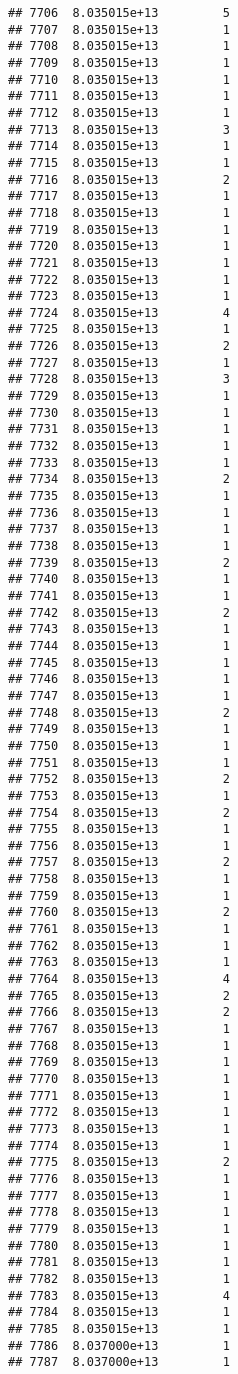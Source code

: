 \documentclass[
]{article}
\begin{document}
\begin{verbatim}
## 7706  8.035015e+13         5
## 7707  8.035015e+13         1
## 7708  8.035015e+13         1
## 7709  8.035015e+13         1
## 7710  8.035015e+13         1
## 7711  8.035015e+13         1
## 7712  8.035015e+13         1
## 7713  8.035015e+13         3
## 7714  8.035015e+13         1
## 7715  8.035015e+13         1
## 7716  8.035015e+13         2
## 7717  8.035015e+13         1
## 7718  8.035015e+13         1
## 7719  8.035015e+13         1
## 7720  8.035015e+13         1
## 7721  8.035015e+13         1
## 7722  8.035015e+13         1
## 7723  8.035015e+13         1
## 7724  8.035015e+13         4
## 7725  8.035015e+13         1
## 7726  8.035015e+13         2
## 7727  8.035015e+13         1
## 7728  8.035015e+13         3
## 7729  8.035015e+13         1
## 7730  8.035015e+13         1
## 7731  8.035015e+13         1
## 7732  8.035015e+13         1
## 7733  8.035015e+13         1
## 7734  8.035015e+13         2
## 7735  8.035015e+13         1
## 7736  8.035015e+13         1
## 7737  8.035015e+13         1
## 7738  8.035015e+13         1
## 7739  8.035015e+13         2
## 7740  8.035015e+13         1
## 7741  8.035015e+13         1
## 7742  8.035015e+13         2
## 7743  8.035015e+13         1
## 7744  8.035015e+13         1
## 7745  8.035015e+13         1
## 7746  8.035015e+13         1
## 7747  8.035015e+13         1
## 7748  8.035015e+13         2
## 7749  8.035015e+13         1
## 7750  8.035015e+13         1
## 7751  8.035015e+13         1
## 7752  8.035015e+13         2
## 7753  8.035015e+13         1
## 7754  8.035015e+13         2
## 7755  8.035015e+13         1
## 7756  8.035015e+13         1
## 7757  8.035015e+13         2
## 7758  8.035015e+13         1
## 7759  8.035015e+13         1
## 7760  8.035015e+13         2
## 7761  8.035015e+13         1
## 7762  8.035015e+13         1
## 7763  8.035015e+13         1
## 7764  8.035015e+13         4
## 7765  8.035015e+13         2
## 7766  8.035015e+13         2
## 7767  8.035015e+13         1
## 7768  8.035015e+13         1
## 7769  8.035015e+13         1
## 7770  8.035015e+13         1
## 7771  8.035015e+13         1
## 7772  8.035015e+13         1
## 7773  8.035015e+13         1
## 7774  8.035015e+13         1
## 7775  8.035015e+13         2
## 7776  8.035015e+13         1
## 7777  8.035015e+13         1
## 7778  8.035015e+13         1
## 7779  8.035015e+13         1
## 7780  8.035015e+13         1
## 7781  8.035015e+13         1
## 7782  8.035015e+13         1
## 7783  8.035015e+13         4
## 7784  8.035015e+13         1
## 7785  8.035015e+13         1
## 7786  8.037000e+13         1
## 7787  8.037000e+13         1

\end{verbatim}
\end{document}
